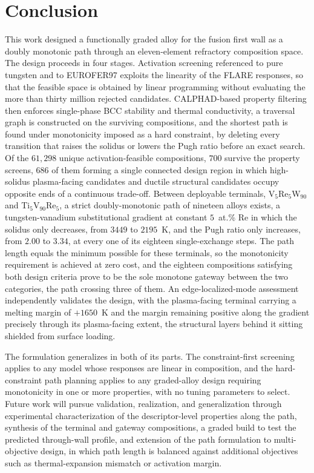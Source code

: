 \section{Conclusion}
This work designed a functionally graded alloy for the fusion first wall as a
doubly monotonic path through an eleven-element refractory composition space.
The design proceeds in four stages. Activation screening referenced to pure
tungsten and to EUROFER97 exploits the linearity of the FLARE responses, so
that the feasible space is obtained by linear programming without evaluating
the more than thirty million rejected candidates. CALPHAD-based property
filtering then enforces single-phase BCC stability and thermal conductivity,
a traversal graph is constructed on the surviving compositions, and the
shortest path is found under monotonicity imposed as a hard constraint, by
deleting every transition that raises the solidus or lowers the Pugh ratio
before an exact search. Of the
\(61{,}298\) unique activation-feasible compositions, \(700\) survive
the property screens, \(686\) of them forming a single connected design
region in which high-solidus plasma-facing candidates and ductile structural
candidates occupy opposite ends of a continuous trade-off. Between deployable
terminals, V\(_{5}\)Re\(_{5}\)W\(_{90}\) and Ti\(_{5}\)V\(_{90}\)Re\(_{5}\),
a strict doubly-monotonic path of nineteen alloys exists, a
tungsten-vanadium substitutional gradient at constant \(5\)~at.\% Re in
which the solidus only decreases, from \(3449\) to \(2195\)~K, and the Pugh
ratio only increases, from \(2.00\) to \(3.34\), at every one of its eighteen
single-exchange steps. The path length equals the minimum possible for these
terminals, so the monotonicity requirement is achieved at zero cost, and the
eighteen compositions satisfying both design criteria prove to be the sole
monotone gateway between the two categories, the path crossing three of
them. An edge-localized-mode assessment independently validates the design,
with the plasma-facing terminal carrying a melting margin of \(+1650\)~K and
the margin remaining positive along the gradient precisely through its
plasma-facing extent, the structural layers behind it sitting shielded from
surface loading.

The formulation generalizes in both of its parts. The constraint-first
screening applies to any model whose responses are linear in composition, and
the hard-constraint path planning applies to any graded-alloy design
requiring monotonicity in one or more properties, with no tuning parameters
to select. Future work will pursue validation, realization, and
generalization through experimental characterization of the
descriptor-level properties along the path, synthesis of the terminal and
gateway compositions, a graded build to test the predicted through-wall
profile, and extension of the path formulation to multi-objective design, in
which path length is balanced against additional objectives such as
thermal-expansion mismatch or activation margin.